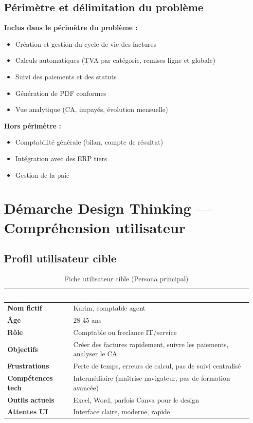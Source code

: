 \documentclass[12pt,a4paper]{report}
\begin{document}
\subsection{Périmètre et délimitation du problème}

\textbf{Inclus dans le périmètre du problème :}
\begin{itemize}
    \item Création et gestion du cycle de vie des factures
    \item Calculs automatiques (TVA par catégorie, remises ligne et globale)
    \item Suivi des paiements et des statuts
    \item Génération de PDF conformes
    \item Vue analytique (CA, impayés, évolution mensuelle)
\end{itemize}

\textbf{Hors périmètre :}
\begin{itemize}
    \item Comptabilité générale (bilan, compte de résultat)
    \item Intégration avec des ERP tiers
    \item Gestion de la paie
\end{itemize}

\section{Démarche Design Thinking — Compréhension utilisateur}

\subsection{Profil utilisateur cible}

\begin{table}[H]
\centering
\caption{Fiche utilisateur cible (Persona principal)}
\label{tab:persona}
\begin{tabularx}{\textwidth}{|l|X|}
\hline
\rowcolor{emsiblue}\textcolor{white}{\textbf{Attribut}} & \textcolor{white}{\textbf{Description}} \\
\hline
\textbf{Nom fictif} & Karim, comptable agent \\
\textbf{Âge} & 28-45 ans \\
\textbf{Rôle} & Comptable ou freelance IT/service \\
\textbf{Objectifs} & Créer des factures rapidement, suivre les paiements, analyser le CA \\
\textbf{Frustrations} & Perte de temps, erreurs de calcul, pas de suivi centralisé \\
\textbf{Compétences tech} & Intermédiaire (maîtrise navigateur, pas de formation avancée) \\
\textbf{Outils actuels} & Excel, Word, parfois Canva pour le design \\
\textbf{Attentes UI} & Interface claire, moderne, rapide \\
\hline
\end{tabularx}
\end{table}
\end{document}

